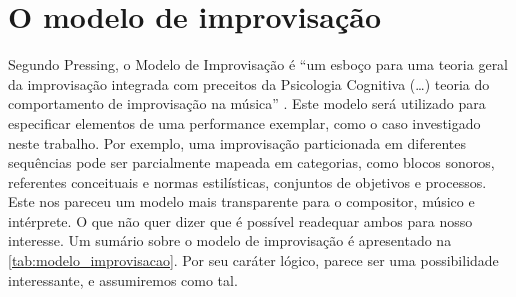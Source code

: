 \section{O modelo de improvisação}\label{sec:im}

Segundo Pressing, o Modelo de Improvisação é ``um esboço para uma teoria geral da improvisação integrada com preceitos da Psicologia Cognitiva (\ldots) teoria do comportamento de improvisação na música'' \cite[p.~2]{pressing_improvisation_1987}. Este modelo será utilizado para especificar elementos de uma performance exemplar, como o caso investigado neste trabalho. Por exemplo, uma improvisação particionada em diferentes sequências pode ser parcialmente mapeada em categorias, como blocos sonoros, referentes conceituais e normas estilísticas, conjuntos de objetivos e processos. Este nos pareceu um modelo mais transparente para o compositor, músico e intérprete. O que não quer dizer que é possível readequar ambos para nosso interesse. Um sumário sobre o modelo de improvisação é apresentado na \autoref{tab:modelo_improvisacao}. Por seu caráter lógico, parece ser uma possibilidade interessante, e assumiremos como tal.

